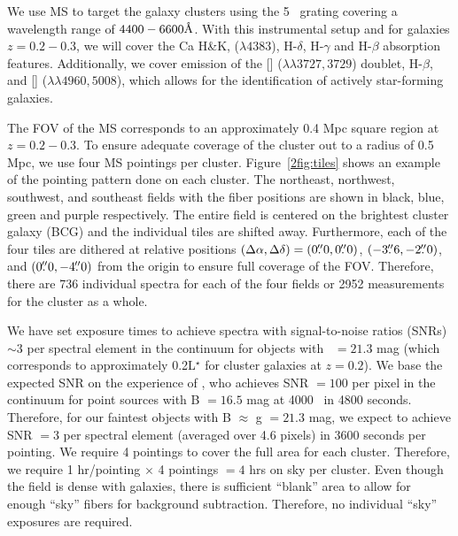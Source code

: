 We use MS to target the galaxy clusters using the 5 \AAA\ grating covering a wavelength range of $4400 - 6600\hbox{\AA}$. With this instrumental setup and for galaxies $z = 0.2-0.3$, we will cover the Ca H\&K, \hbox{} ($\lambda 4383$), H-$\delta$, H-$\gamma$ and H-$\beta$ absorption features. Additionally, we cover emission of the \hbox{[]} ($\lambda\lambda 3727,3729$) doublet, H-$\beta$, and \hbox{[]} ($\lambda\lambda 4960,5008$), which allows for the identification of actively star-forming galaxies.

The FOV of the MS corresponds to an approximately 0.4 Mpc square region at $z = 0.2-0.3$. To ensure adequate coverage of the cluster out to a radius of 0.5 Mpc, we use four MS pointings per cluster. Figure~\ref{2fig:tiles} shows an example of the pointing pattern done on each cluster. The northeast, northwest, southwest, and southeast fields with the fiber positions are shown in black, blue, green and purple respectively. The entire field is centered on the brightest cluster galaxy (BCG) and the individual tiles are shifted away. Furthermore, each of the four tiles are dithered at relative positions $(\Delta \alpha, \Delta \delta)=(0\mbox{\ensuremath{.\!\!^{\prime\prime}}}0,0\mbox{\ensuremath{.\!\!^{\prime\prime}}}0)$, $(-3\mbox{\ensuremath{.\!\!^{\prime\prime}}}6,-2\mbox{\ensuremath{.\!\!^{\prime\prime}}}0)$, and $(0\mbox{\ensuremath{.\!\!^{\prime\prime}}}0, -4\mbox{\ensuremath{.\!\!^{\prime\prime}}}0)$ from the origin to ensure full coverage of the FOV. Therefore, there are 736 individual spectra for each of the four fields or 2952 measurements for the cluster as a whole.

We have set exposure times to achieve spectra with signal-to-noise ratios (SNRs) $\sim3$ per spectral element in the continuum for objects with \sdssg\ $= 21.3$ mag (which corresponds to approximately 0.2L$^\star$ for cluster galaxies at $z = 0.2$). We base the expected SNR on the experience of \cite{Shetrone2010}, who achieves SNR $= 100$ per pixel in the continuum for point sources with B $=16.5$ mag at 4000 \AAA\ in 4800 seconds. Therefore, for our faintest objects with B $\approx$ g $= 21.3$ mag, we expect to achieve SNR $= 3$ per spectral element (averaged over 4.6 pixels) in 3600 seconds per pointing. We require 4 pointings to cover the full area for each cluster. Therefore, we require 1 hr/pointing $\times$ 4 pointings $= 4$ hrs on sky per cluster. Even though the field is dense with galaxies, there is sufficient ``blank'' area to allow for enough ``sky'' fibers for background subtraction. Therefore, no individual ``sky'' exposures are required.

